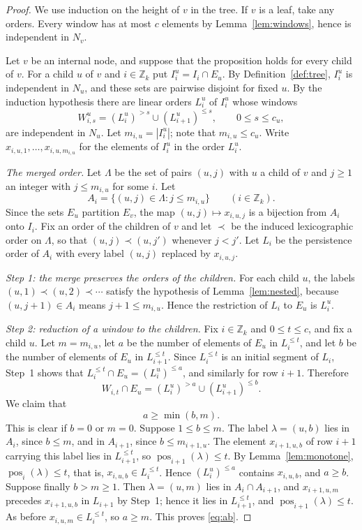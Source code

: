 \documentclass[11pt]{amsart}
\theoremstyle{definition}
\theoremstyle{remark}
\numberwithin{equation}{section}
\newcommand{\Z}{\mathbb{Z}}
\newcommand{\pos}{\operatorname{pos}}
\begin{document}
\begin{proof}
We use induction on the height of $v$ in the tree. If $v$ is a leaf, take any orders. Every window has at most $c$ elements by Lemma~\ref{lem:windows}, hence is independent in $N_v$.

Let $v$ be an internal node, and suppose that the proposition holds for every child of $v$. For a child $u$ of $v$ and $i\in\Z_k$ put $I_i^u=I_i\cap E_u$. By Definition~\ref{def:tree}, $I_i^u$ is independent in $N_u$, and these sets are pairwise disjoint for fixed $u$. By the induction hypothesis there are linear orders $L_i^u$ of $I_i^u$ whose windows
\[
W_{i,s}^u=(L_i^u)^{>s}\cup(L_{i+1}^u)^{\le s},\qquad 0\le s\le c_u,
\]
are independent in $N_u$. Let $m_{i,u}=|I_i^u|$; note that $m_{i,u}\le c_u$. Write $x_{i,u,1},\dots,x_{i,u,m_{i,u}}$ for the elements of $I_i^u$ in the order $L_i^u$.

\emph{The merged order.} Let $\Lambda$ be the set of pairs $(u,j)$ with $u$ a child of $v$ and $j\ge1$ an integer with $j\le m_{i,u}$ for some $i$. Let
\[
A_i=\{(u,j)\in\Lambda: j\le m_{i,u}\}\qquad(i\in\Z_k).
\]
Since the sets $E_u$ partition $E_v$, the map $(u,j)\mapsto x_{i,u,j}$ is a bijection from $A_i$ onto $I_i$. Fix an order of the children of $v$ and let $\prec$ be the induced lexicographic order on $\Lambda$, so that $(u,j)\prec(u,j')$ whenever $j<j'$. Let $L_i$ be the persistence order of $A_i$ with every label $(u,j)$ replaced by $x_{i,u,j}$.

\emph{Step 1: the merge preserves the orders of the children.} For each child $u$, the labels $(u,1)\prec(u,2)\prec\cdots$ satisfy the hypothesis of Lemma~\ref{lem:nested}, because $(u,j+1)\in A_i$ means $j+1\le m_{i,u}$. Hence the restriction of $L_i$ to $E_u$ is $L_i^u$.

\emph{Step 2: reduction of a window to the children.} Fix $i\in\Z_k$ and $0\le t\le c$, and fix a child $u$. Let $m=m_{i,u}$, let $a$ be the number of elements of $E_u$ in $L_i^{\le t}$, and let $b$ be the number of elements of $E_u$ in $L_{i+1}^{\le t}$. Since $L_i^{\le t}$ is an initial segment of $L_i$, Step~1 shows that $L_i^{\le t}\cap E_u=(L_i^u)^{\le a}$, and similarly for row $i+1$. Therefore
\begin{equation}\label{eq:restriction}
W_{i,t}\cap E_u=(L_i^u)^{>a}\cup(L_{i+1}^u)^{\le b}.
\end{equation}
We claim that
\begin{equation}\label{eq:ab}
a\ge\min(b,m).
\end{equation}
This is clear if $b=0$ or $m=0$. Suppose $1\le b\le m$. The label $\lambda=(u,b)$ lies in $A_i$, since $b\le m$, and in $A_{i+1}$, since $b\le m_{i+1,u}$. The element $x_{i+1,u,b}$ of row $i+1$ carrying this label lies in $L_{i+1}^{\le t}$, so $\pos_{i+1}(\lambda)\le t$. By Lemma~\ref{lem:monotone}, $\pos_i(\lambda)\le t$, that is, $x_{i,u,b}\in L_i^{\le t}$. Hence $(L_i^u)^{\le a}$ contains $x_{i,u,b}$, and $a\ge b$. Suppose finally $b>m\ge1$. Then $\lambda=(u,m)$ lies in $A_i\cap A_{i+1}$, and $x_{i+1,u,m}$ precedes $x_{i+1,u,b}$ in $L_{i+1}$ by Step~1; hence it lies in $L_{i+1}^{\le t}$, and $\pos_{i+1}(\lambda)\le t$. As before $x_{i,u,m}\in L_i^{\le t}$, so $a\ge m$. This proves \eqref{eq:ab}.


\end{proof}
\end{document}
